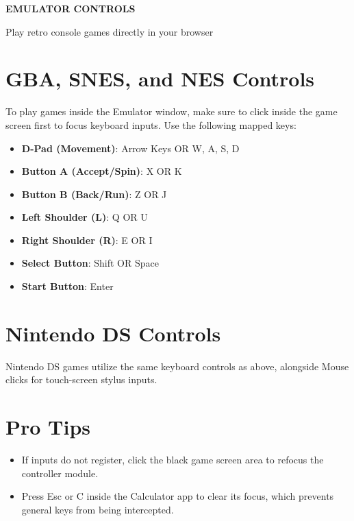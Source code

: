 \documentclass[letterpaper,11pt]{article}
\begin{document}
\centerline{\Huge \bf EMULATOR CONTROLS}
\centerline{Play retro console games directly in your browser}

\section{GBA, SNES, and NES Controls}
To play games inside the Emulator window, make sure to click inside the game screen first to focus keyboard inputs. Use the following mapped keys:

\begin{itemize}
    \item \textbf{D-Pad (Movement)}: Arrow Keys OR W, A, S, D
    \item \textbf{Button A (Accept/Spin)}: X OR K
    \item \textbf{Button B (Back/Run)}: Z OR J
    \item \textbf{Left Shoulder (L)}: Q OR U
    \item \textbf{Right Shoulder (R)}: E OR I
    \item \textbf{Select Button}: Shift OR Space
    \item \textbf{Start Button}: Enter
\end{itemize}

\section{Nintendo DS Controls}
Nintendo DS games utilize the same keyboard controls as above, alongside Mouse clicks for touch-screen stylus inputs.

\section{Pro Tips}
\begin{itemize}
    \item If inputs do not register, click the black game screen area to refocus the controller module.
    \item Press Esc or C inside the Calculator app to clear its focus, which prevents general keys from being intercepted.
\end{itemize}
\end{document}
